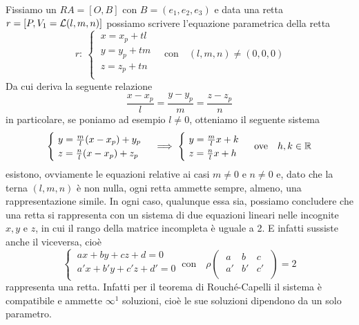 \documentclass[twoside]{report}
\begin{document}
Fissiamo un \(RA = [O, B]\) con \(B = (e_1, e_2, e_3)\) e data una retta \(r = [P, V_1=\mathcal{L}(l,m,n) ]\) possiamo scrivere l'equazione parametrica della retta \[
r : \
\begin{cases}
    \ x = x_p + tl \\
    \ y = y_p + tm \\
    \ z = z_p + tn \\
\end{cases} \quad \text{con}\quad (l,m,n) \neq (0,0,0)
\] Da cui deriva la seguente relazione \[
\frac{x-x_p}{l} = \frac{y-y_p}{m} = \frac{z - z_p}{n}
\] in particolare, se poniamo ad esempio \(l \neq 0\), otteniamo il seguente sistema \[
\begin{cases}
    \ y = \frac{m}{l} (x-x_p) + y_p \\
    \ z = \frac{n}{l} (x-x_p) + z_p \\
\end{cases} \implies 
\begin{cases}
    \ y = \frac{m}{l} x + k \\
    \ z = \frac{n}{l} x + h \\
\end{cases} \ \text{ove} \quad h, k \in \RR 
\] esistono, ovviamente le equazioni relative ai casi \(m \neq 0\) e \(n \neq 0\) e, dato che la terna \((l,m,n)\) è non nulla, ogni retta ammette sempre, almeno, una rappresentazione simile. In ogni caso, qualunque essa sia, possiamo concludere che una retta si rappresenta con un sistema di due equazioni lineari nelle incognite \(x, y\) e \(z\), in cui il rango della matrice incompleta è uguale a 2. E infatti sussiste anche il viceversa, cioè \[
\begin{cases}
    \ ax + by + cz + d = 0 \\
    \ a'x + b'y + c'z + d' = 0 \\
\end{cases} \ \text{con} \quad \rho
\left( \; \begin{matrix}
    a & b & c \\
    a' & b' & c' \\
\end{matrix} \; \right) = 2
\] rappresenta una retta. Infatti per il teorema di Rouché-Capelli il sistema è compatibile e ammette \(\infty^{1}\) soluzioni, cioè le sue soluzioni dipendono da un solo parametro.  
\end{document}

